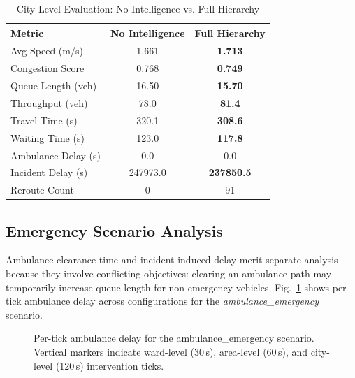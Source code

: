\documentclass[conference]{IEEEtran}
\begin{document}
\begin{table}[!t]
\caption{City-Level Evaluation: No Intelligence vs. Full Hierarchy}
\label{tab:city_results}
\centering
\renewcommand{\arraystretch}{1.2}
\begin{tabular}{lcc}
\toprule
\textbf{Metric} & \textbf{No Intelligence} & \textbf{Full Hierarchy} \\
\midrule
Avg Speed (m/s)       & 1.661   & \textbf{1.713} \\
Congestion Score      & 0.768   & \textbf{0.749} \\
Queue Length (veh)    & 16.50   & \textbf{15.70} \\
Throughput (veh)      & 78.0    & \textbf{81.4} \\
Travel Time (s)       & 320.1   & \textbf{308.6} \\
Waiting Time (s)      & 123.0   & \textbf{117.8} \\
Ambulance Delay (s)   & 0.0     & 0.0 \\
Incident Delay (s)    & 247973.0& \textbf{237850.5} \\
Reroute Count         & 0       & 91 \\
\bottomrule
\end{tabular}
\end{table}

\subsection{Emergency Scenario Analysis}

Ambulance clearance time and incident-induced delay merit separate analysis
because they involve conflicting objectives: clearing an ambulance path may
temporarily increase queue length for non-emergency vehicles. Fig.~\ref{fig:emergency_timeseries}
shows per-tick ambulance delay across configurations for the
\textit{ambulance\_emergency} scenario.

\begin{figure}[!t]
\centering
{}
\caption{Per-tick ambulance delay for the ambulance\_emergency scenario.
Vertical markers indicate ward-level (30\,s), area-level (60\,s), and
city-level (120\,s) intervention ticks.}
\label{fig:emergency_timeseries}
\end{figure}
\end{document}
